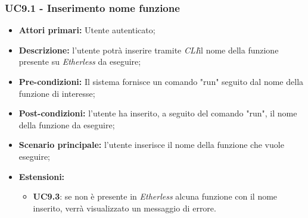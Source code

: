 \subsubsection{UC9.1 - Inserimento nome funzione}
\begin{itemize}
	\item \textbf{Attori primari:} Utente autenticato;
	\item \textbf{Descrizione:} l'utente potrà inserire tramite \textit{CLI\glos}il nome della funzione presente su \textit{Etherless} da eseguire; 
	\item \textbf{Pre-condizioni:} Il sistema fornisce un comando "run" seguito dal nome della funzione di interesse;
	\item \textbf{Post-condizioni:} l'utente ha inserito, a seguito del comando "run", il nome della funzione da eseguire;
	\item \textbf{Scenario principale:} l'utente inserisce il nome della funzione che vuole eseguire;
	\item \textbf{Estensioni:} 
	\begin{itemize}
		\item \textbf{UC9.3}: se non è presente in \textit{Etherless} alcuna funzione con il nome inserito, verrà visualizzato un messaggio di errore.
	\end{itemize}
\end{itemize}
